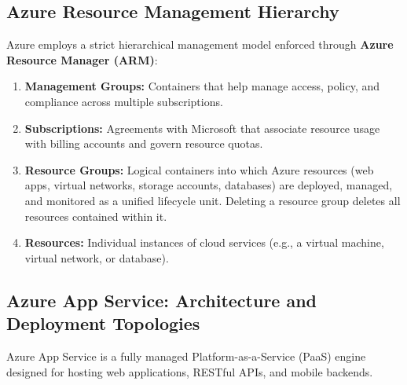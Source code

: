 \subsection{Azure Resource Management Hierarchy}
Azure employs a strict hierarchical management model enforced through \textbf{Azure Resource Manager (ARM)}:
\begin{enumerate}[leftmargin=*]
  \item \textbf{Management Groups:} Containers that help manage access, policy, and compliance across multiple subscriptions.
  \item \textbf{Subscriptions:} Agreements with Microsoft that associate resource usage with billing accounts and govern resource quotas.
  \item \textbf{Resource Groups:} Logical containers into which Azure resources (web apps, virtual networks, storage accounts, databases) are deployed, managed, and monitored as a unified lifecycle unit. Deleting a resource group deletes all resources contained within it.
  \item \textbf{Resources:} Individual instances of cloud services (e.g., a virtual machine, virtual network, or database).
\end{enumerate}

\subsection{Azure App Service: Architecture and Deployment Topologies}
Azure App Service is a fully managed Platform-as-a-Service (PaaS) engine designed for hosting web applications, RESTful APIs, and mobile backends.

